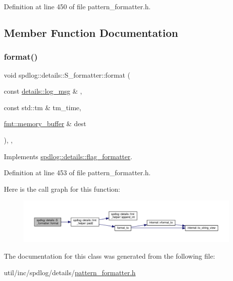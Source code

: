 Definition at line 450 of file pattern\+\_\+formatter.\+h.



\subsection{Member Function Documentation}
\mbox{\label{classspdlog_1_1details_1_1_s__formatter_aec1945b20074132e9ebe7d94357081fa}} 
\subsubsection{\texorpdfstring{format()}{format()}}
{\footnotesize\ttfamily void spdlog\+::details\+::\+S\+\_\+formatter\+::format (\begin{DoxyParamCaption}\item[{const \hyperlink{structspdlog_1_1details_1_1log__msg}{details\+::log\+\_\+msg} \&}]{,  }\item[{const std\+::tm \&}]{tm\+\_\+time,  }\item[{\hyperlink{format_8h_a21cbf729f69302f578e6db21c5e9e0d2}{fmt\+::memory\+\_\+buffer} \&}]{dest }\end{DoxyParamCaption})\hspace{0.3cm}{\ttfamily [inline]}, {\ttfamily [override]}, {\ttfamily [virtual]}}



Implements \hyperlink{classspdlog_1_1details_1_1flag__formatter_a33fb3e42a4c8200cceb833d92b53fb67}{spdlog\+::details\+::flag\+\_\+formatter}.



Definition at line 453 of file pattern\+\_\+formatter.\+h.

Here is the call graph for this function\+:
\nopagebreak
\begin{figure}[H]
\begin{center}
\leavevmode
\includegraphics[width=350pt]{classspdlog_1_1details_1_1_s__formatter_aec1945b20074132e9ebe7d94357081fa_cgraph}
\end{center}
\end{figure}


The documentation for this class was generated from the following file\+:\begin{DoxyCompactItemize}
\item 
util/inc/spdlog/details/\hyperlink{pattern__formatter_8h}{pattern\+\_\+formatter.\+h}\end{DoxyCompactItemize}

